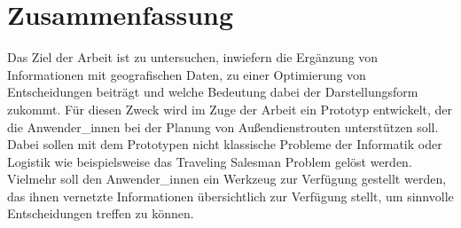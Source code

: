 \documentclass[Bachelorarbeit.tex]{subfiles}
\begin{document}
\chapter*{Zusammenfassung}

Das Ziel der Arbeit ist zu untersuchen, 
inwiefern die Ergänzung  von Informationen mit geografischen Daten, 
zu einer Optimierung von Entscheidungen beiträgt und welche Bedeutung dabei der Darstellungsform zukommt. 
Für diesen Zweck wird im Zuge der Arbeit ein Prototyp entwickelt, der die Anwender\_innen bei der Planung von Außendienstrouten unterstützen soll. 
Dabei sollen mit dem Prototypen nicht klassische Probleme der Informatik oder Logistik wie beispielsweise das Traveling Salesman Problem gelöst werden. Vielmehr soll den Anwender\_innen ein Werkzeug zur Verfügung gestellt werden, das ihnen vernetzte Informationen übersichtlich zur Verfügung stellt, um sinnvolle Entscheidungen treffen zu können.\\
\\
\end{document}
